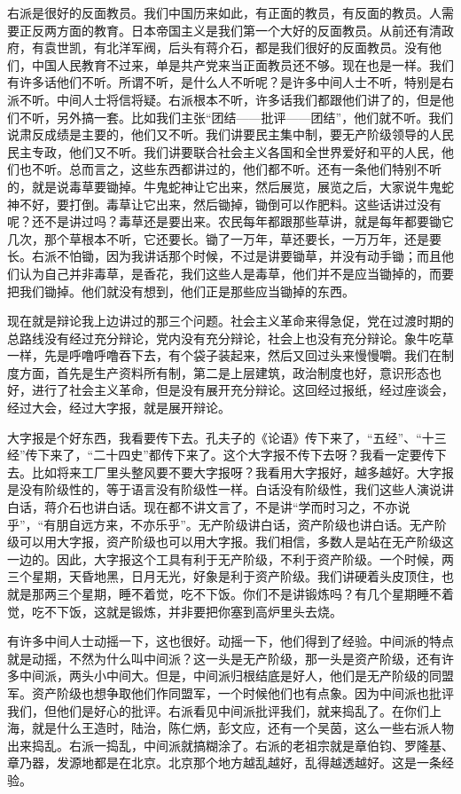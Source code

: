 右派是很好的反面教员。我们中国历来如此，有正面的教员，有反面的教员。人需要正反两方面的教育。日本帝国主义是我们第一个大好的反面教员。从前还有清政府，有袁世凯，有北洋军阀，后头有蒋介石，都是我们很好的反面教员。没有他们，中国人民教育不过来，单是共产党来当正面教员还不够。现在也是一样。我们有许多话他们不听。所谓不听，是什么人不听呢？是许多中间人士不听，特别是右派不听。中间人士将信将疑。右派根本不听，许多话我们都跟他们讲了的，但是他们不听，另外搞一套。比如我们主张“团结——批评——团结”，他们就不听。我们说肃反成绩是主要的，他们又不听。我们讲要民主集中制，要无产阶级领导的人民民主专政，他们又不听。我们讲要联合社会主义各国和全世界爱好和平的人民，他们也不听。总而言之，这些东西都讲过的，他们都不听。还有一条他们特别不听的，就是说毒草要锄掉。牛鬼蛇神让它出来，然后展览，展览之后，大家说牛鬼蛇神不好，要打倒。毒草让它出来，然后锄掉，锄倒可以作肥料。这些话讲过没有呢？还不是讲过吗？毒草还是要出来。农民每年都跟那些草讲，就是每年都要锄它几次，那个草根本不听，它还要长。锄了一万年，草还要长，一万万年，还是要长。右派不怕锄，因为我讲话那个时候，不过是讲要锄草，并没有动手锄；而且他们认为自己并非毒草，是香花，我们这些人是毒草，他们并不是应当锄掉的，而要把我们锄掉。他们就没有想到，他们正是那些应当锄掉的东西。

现在就是辩论我上边讲过的那三个问题。社会主义革命来得急促，党在过渡时期的总路线没有经过充分辩论，党内没有充分辩论，社会上也没有充分辩论。象牛吃草一样，先是呼噜呼噜吞下去，有个袋子装起来，然后又回过头来慢慢嚼。我们在制度方面，首先是生产资料所有制，第二是上层建筑，政治制度也好，意识形态也好，进行了社会主义革命，但是没有展开充分辩论。这回经过报纸，经过座谈会，经过大会，经过大字报，就是展开辩论。

大字报是个好东西，我看要传下去。孔夫子的《论语》传下来了，“五经”、“十三经”传下来了，“二十四史”都传下来了。这个大字报不传下去呀？我看一定要传下去。比如将来工厂里头整风要不要大字报呀？我看用大字报好，越多越好。大字报是没有阶级性的，等于语言没有阶级性一样。白话没有阶级性，我们这些人演说讲白话，蒋介石也讲白话。现在都不讲文言了，不是讲“学而时习之，不亦说乎”，“有朋自远方来，不亦乐乎”。无产阶级讲白话，资产阶级也讲白话。无产阶级可以用大字报，资产阶级也可以用大字报。我们相信，多数人是站在无产阶级这一边的。因此，大字报这个工具有利于无产阶级，不利于资产阶级。一个时候，两三个星期，天昏地黑，日月无光，好象是利于资产阶级。我们讲硬着头皮顶住，也就是那两三个星期，睡不着觉，吃不下饭。你们不是讲锻炼吗？有几个星期睡不着觉，吃不下饭，这就是锻炼，并非要把你塞到高炉里头去烧。

有许多中间人士动摇一下，这也很好。动摇一下，他们得到了经验。中间派的特点就是动摇，不然为什么叫中间派？这一头是无产阶级，那一头是资产阶级，还有许多中间派，两头小中间大。但是，中间派归根结底是好人，他们是无产阶级的同盟军。资产阶级也想争取他们作同盟军，一个时候他们也有点象。因为中间派也批评我们，但他们是好心的批评。右派看见中间派批评我们，就来捣乱了。在你们上海，就是什么王造时，陆治，陈仁炳，彭文应，还有一个吴茵，这么一些右派人物出来捣乱。右派一捣乱，中间派就搞糊涂了。右派的老祖宗就是章伯钧、罗隆基、章乃器，发源地都是在北京。北京那个地方越乱越好，乱得越透越好。这是一条经验。

